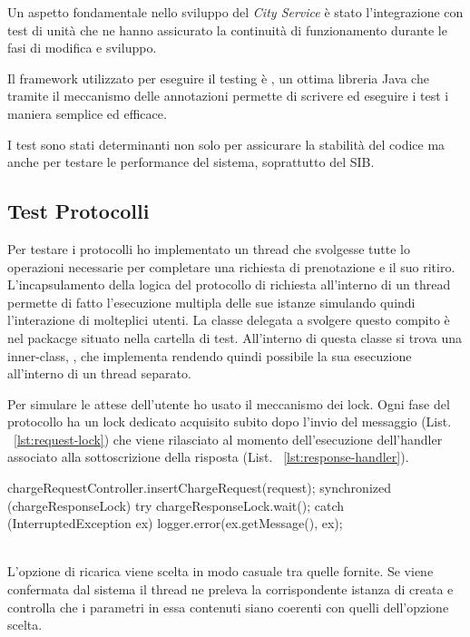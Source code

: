 Un aspetto fondamentale nello sviluppo del \emph{City Service} è stato l'integrazione con test di unità che ne hanno assicurato la continuità di funzionamento durante le fasi di modifica e sviluppo.

Il framework utilizzato per eseguire il testing è , un ottima libreria Java che tramite il meccanismo delle annotazioni permette di scrivere ed eseguire i test i maniera semplice ed efficace.

I test sono stati determinanti non solo per assicurare la stabilità del codice ma anche per testare le performance del sistema, soprattutto del SIB. 

\subsection{Test Protocolli}

Per testare i protocolli ho implementato un thread che svolgesse tutte lo operazioni necessarie per completare una richiesta di prenotazione e il suo ritiro. L'incapsulamento della logica del protocollo di richiesta all'interno di un thread permette di fatto l'esecuzione multipla delle sue istanze simulando quindi l'interazione di molteplici utenti. La classe delegata a svolgere questo compito è  nel packacge  situato nella cartella di test. All'interno di questa classe si trova una inner-class, , che implementa  rendendo quindi possibile la sua esecuzione all'interno di un thread separato. 

Per simulare le attese dell'utente ho usato il meccanismo dei lock. Ogni fase del protocollo ha un lock dedicato acquisito subito dopo l'invio del messaggio (List. ~\ref{lst:request-lock}) che viene rilasciato al momento dell'esecuzione dell'handler associato alla sottoscrizione della risposta (List. ~\ref{lst:response-handler}).

\begin{java}[caption={Inserimento della \code{CargeRequest} e attesa della risposta},label={lst:request-lock}]
chargeRequestController.insertChargeRequest(request);
synchronized (chargeResponseLock) {
	try {
		chargeResponseLock.wait();
	} catch (InterruptedException ex) {
		logger.error(ex.getMessage(), ex);
	}
}
\end{java}

\begin{java}[caption={Handler associato al messaggio di risposta},label={lst:response-handler}]
String subscriptionID = xmlTools.getSubscriptionID(xml);
if (chargeResponseSubId.equals(subscriptionID)) {
		[...]
		chargeResponsesUri = subscriptionResult.get(0);
		synchronized (chargeResponseLock) {
			chargeResponseLock.notify();
		}
	}
}
\end{java}
\\
\noindent
L'opzione di ricarica viene scelta in modo casuale tra quelle fornite. Se viene confermata dal sistema il thread ne preleva la corrispondente istanza di  creata e controlla che i parametri in essa contenuti siano coerenti con quelli dell'opzione scelta.

